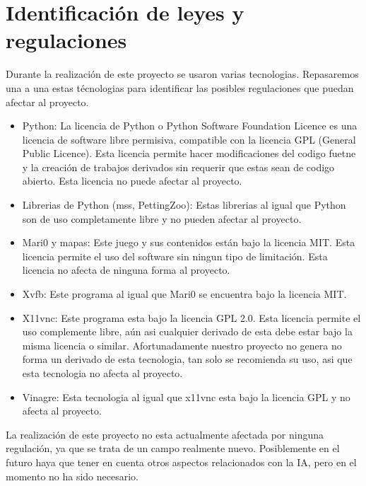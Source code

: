 \section{Identificación de leyes y regulaciones}

Durante la realización de este proyecto se usaron varias tecnologias. Repasaremos una a una estas técnologias para identificar las posibles regulaciones que puedan afectar al proyecto.

\begin{itemize}
    \item Python: La licencia de Python o Python Software Foundation Licence es una licencia de software libre permisiva, compatible con la licencia GPL (General Public Licence). Esta licencia permite hacer modificaciones del codigo fuetne  y la creación de trabajos derivados sin requerir que estas sean de codigo abierto. Esta licencia no puede afectar al proyecto.
    \item Librerias de Python (mss, PettingZoo): Estas librerias al igual que Python son de uso completamente libre y no pueden afectar al proyecto.
    \item Mari0 y mapas: Este juego y sus contenidos están bajo la licencia MIT. Esta licencia permite el uso del software sin ningun tipo de limitación. Esta licencia no afecta de ninguna forma al proyecto.
    \item Xvfb: Este programa al igual que Mari0 se encuentra bajo la licencia MIT.
    \item X11vnc: Este programa esta bajo la licencia GPL 2.0. Esta licencia permite el uso complemente libre, aún asi cualquier derivado de esta debe estar bajo la misma licencia o similar. Afortunadamente nuestro proyecto no genera no forma un derivado de esta tecnologia, tan solo se recomienda su uso, asi que esta tecnologia no afecta al proyecto.
    \item Vinagre: Esta tecnologia al igual que x11vnc esta bajo la licencia GPL y no afecta al proyecto.
\end{itemize}

La realización de este proyecto no esta actualmente afectada por ninguna regulación, ya que se trata de un campo realmente nuevo. Posiblemente en el futuro haya que tener en cuenta otros aspectos relacionados con la IA, pero en el momento no ha sido necesario.
